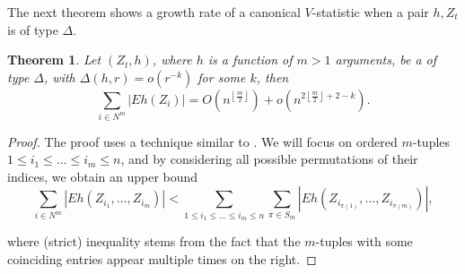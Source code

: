 \documentclass{article} %
\newtheorem{Theorem}{Theorem}
\newcommand{\ev}{E}
\begin{document}
The next theorem shows a growth rate of  a canonical $V$-statistic when a pair $h,Z_{t}$ is of type $\varDelta$. 
\begin{Theorem}
\label{th:boundTh}
Let $(Z_{t},h)$, where $h$ is a function of $m>1$ arguments, be a  of type $\varDelta$, with $\varDelta(h,r) = o( r^{-k})$ for some $k$, then
\begin{equation*}
\sum_{i\in N^{m}}\left| \ev  h(Z_i) \right| =  O\left(n^{\left\lfloor \frac{m}{2}\right\rfloor }\right)+ o\left(n^{2\left\lfloor \frac{m}{2}\right\rfloor +2-k}\right).
\end{equation*}
\end{Theorem}
\begin{proof} 
The proof uses a technique similar to   \cite[Lemma 3]{arcones1998law}.
 We will focus on ordered $m$-tuples $1\leq i_{1}\leq\ldots\leq i_{m}\leq n$,
and by considering all possible permutations of their indices, we
obtain an upper bound 
\begin{equation*}
\sum_{i\in N^{m}}\left|\ev  h\left(Z_{i_{1}},\ldots,Z_{i_{m}}\right)\right|  <  \sum_{1\leq i_{1}\leq\ldots\leq i_{m}\leq n}\sum_{\pi\in S_{m}}\left|  \ev h\left(Z_{i_{\pi(1)}},\ldots,Z_{i_{\pi(m)}}\right)\right|,
\end{equation*}

where (strict) inequality stems from the fact that the $m$-tuples
with some coinciding entries appear multiple times on the right.


\end{proof}
\end{document}
